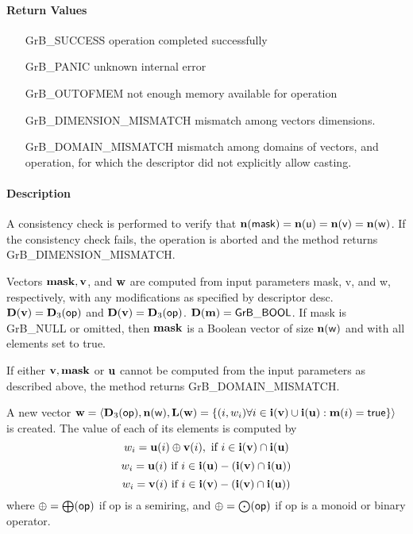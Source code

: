 \paragraph{Return Values}

\begin{itemize}[leftmargin=2.1in]
\item[{\sf GrB\_SUCCESS}]             operation completed successfully
\item[{\sf GrB\_PANIC}]               unknown internal error
\item[{\sf GrB\_OUTOFMEM}]            not enough memory available for operation
\item[{\sf GrB\_DIMENSION\_MISMATCH}] mismatch among vectors dimensions.
\item[{\sf GrB\_DOMAIN\_MISMATCH}]    mismatch among domains of vectors, and operation, for which the descriptor did not explicitly allow casting.
\end{itemize}

\paragraph{Description}

A consistency check is performed to verify that $\bold{n}({\sf mask})
= \bold{n}({\sf u}) = \bold{n}({\sf v}) = \bold{n}({\sf w})$. If the consistency check
fails, the operation is aborted and the method returns {\sf GrB\_DIMENSION\_MISMATCH}.


Vectors ${\bf mask}, {\bf v}$, and ${\bf w}$ are computed from
input parameters {\sf mask}, {\sf v}, and {\sf w}, respectively, with any
modifications as specified by descriptor {\sf desc}.  $\bold{D}({\bf v}) =
\bold{D}_3({\sf op})$ and $\bold{D}({\bf v}) = \bold{D}_3({\sf op})$.
$\bold{D}({\bf m}) = {\sf GrB\_BOOL}$.  If {\sf mask} is {\sf GrB\_NULL} or omitted,
then ${\bf mask}$ is a Boolean vector of size $\bold{n}({\bf \sf w})$
and with all elements set to {\sf true}.

If either ${\bf v}, {\bf mask}$ or ${\bf u}$ cannot be computed
from the input parameters as described above, the method returns {\sf
GrB\_DOMAIN\_MISMATCH}. 

A new vector ${\bf w} = \langle \bold{D}_3({\sf op}),
\bold{n}({\bf \sf w}), \bold{L}({\bf w}) = \{(i,w_i)  \forall i \in
{\bf i}({\bf v}) \cup {\bf i}({\bf u}) : {\bf m}(i)
= {\sf true} \} \rangle$ is created.  The value of each of its
elements is computed by 
\[
w_i = {\bf u}(i) \oplus {\bf v}(i), \ \mbox{if}\  i \in  {\bf i}({\bf v}) \cap {\bf i}({\bf u})
\]
\[
w_i = {\bf u}(i) \ \mbox{if}\  i \in  {\bf i}({\bf u}) - ({\bf i}({\bf v}) \cap {\bf i}({\bf u}))
\]
\[
w_i = {\bf v}(i) \ \mbox{if}\  i \in  {\bf i}({\bf v}) - ({\bf i}({\bf v}) \cap {\bf i}({\bf u}))
\]
where $\oplus = \bigoplus({\sf op})$ if {\sf op} is a semiring, and $\oplus = \bigodot({\sf op})$
if {\sf op} is a monoid or binary operator.

